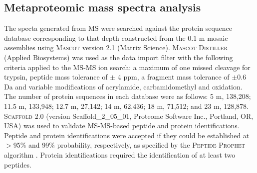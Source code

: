 
\subsection{Metaproteomic mass spectra analysis}
The specta generated from \ac{MS} were searched against the protein sequence database corresponding to that depth constructed from the 0.1 \textmu{}m mosaic assemblies using \textsc{Mascot} version 2.1 (Matrix Science).
\textsc{Mascot Distiller} (Applied Biosystems) was used as the data import filter with the following criteria applied to the \ac{MS-MS} ion search: a maximum of one missed cleavage for trypsin, peptide mass tolerance of $\pm$ 4 ppm, a fragment mass tolerance of $\pm$0.6 Da and variable modifications of acrylamide, carbamidomethyl and oxidation.
The number of protein sequences in each database were as follows: 5 m, 138,208; 11.5 m, 133,948; 12.7 m, 27,142; 14 m, 62,436; 18 m, 71,512; and 23 m, 128,878. 
\textsc{Scaffold} 2.0 (version Scaffold\_2\_05\_01, Proteome Software Inc., Portland, \textsc{OR}, \textsc{USA}) was used to validate \ac{MS-MS}-based peptide and protein identifications. 
Peptide and protein identifications were accepted if they could be established at $>$95\% and 99\% probability, respectively, as specified by the \textsc{Peptide Prophet} algorithm \cite{Keller2002}. 
Protein identifications required the identification of at least two peptides.
 
